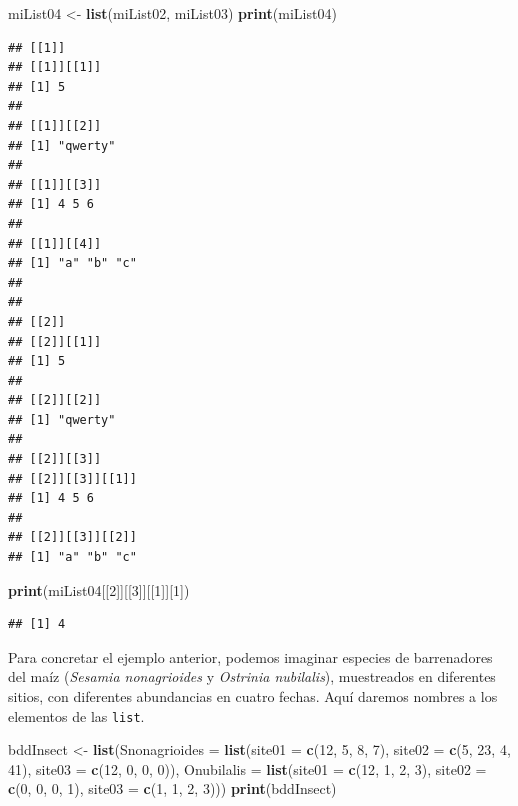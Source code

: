\documentclass[
]{book}
\newenvironment{Shaded}{\begin{snugshade}}{\end{snugshade}}
\newcommand{\DataTypeTok}[1]{\textcolor[rgb]{0.13,0.29,0.53}{#1}}
\newcommand{\DecValTok}[1]{\textcolor[rgb]{0.00,0.00,0.81}{#1}}
\newcommand{\KeywordTok}[1]{\textcolor[rgb]{0.13,0.29,0.53}{\textbf{#1}}}
\newcommand{\NormalTok}[1]{#1}
\newcommand{\StringTok}[1]{\textcolor[rgb]{0.31,0.60,0.02}{#1}}
\begin{document}
\begin{Shaded}
\begin{Highlighting}[]
\NormalTok{miList04 <-}\StringTok{ }\KeywordTok{list}\NormalTok{(miList02, miList03)}
\KeywordTok{print}\NormalTok{(miList04)}
\end{Highlighting}
\end{Shaded}

\begin{verbatim}
## [[1]]
## [[1]][[1]]
## [1] 5
## 
## [[1]][[2]]
## [1] "qwerty"
## 
## [[1]][[3]]
## [1] 4 5 6
## 
## [[1]][[4]]
## [1] "a" "b" "c"
## 
## 
## [[2]]
## [[2]][[1]]
## [1] 5
## 
## [[2]][[2]]
## [1] "qwerty"
## 
## [[2]][[3]]
## [[2]][[3]][[1]]
## [1] 4 5 6
## 
## [[2]][[3]][[2]]
## [1] "a" "b" "c"
\end{verbatim}

\begin{Shaded}
\begin{Highlighting}[]
\KeywordTok{print}\NormalTok{(miList04[[}\DecValTok{2}\NormalTok{]][[}\DecValTok{3}\NormalTok{]][[}\DecValTok{1}\NormalTok{]][}\DecValTok{1}\NormalTok{])}
\end{Highlighting}
\end{Shaded}

\begin{verbatim}
## [1] 4
\end{verbatim}

Para concretar el ejemplo anterior, podemos imaginar especies de barrenadores del maíz (\emph{Sesamia nonagrioides} y \emph{Ostrinia nubilalis}), muestreados en diferentes sitios, con diferentes abundancias en cuatro fechas. Aquí daremos nombres a los elementos de las \texttt{list}.

\begin{Shaded}
\begin{Highlighting}[]
\NormalTok{bddInsect <-}\StringTok{ }\KeywordTok{list}\NormalTok{(}\DataTypeTok{Snonagrioides =} \KeywordTok{list}\NormalTok{(}\DataTypeTok{site01 =} \KeywordTok{c}\NormalTok{(}\DecValTok{12}\NormalTok{, }\DecValTok{5}\NormalTok{, }\DecValTok{8}\NormalTok{, }\DecValTok{7}\NormalTok{), }\DataTypeTok{site02 =} \KeywordTok{c}\NormalTok{(}\DecValTok{5}\NormalTok{, }\DecValTok{23}\NormalTok{, }\DecValTok{4}\NormalTok{, }\DecValTok{41}\NormalTok{), }\DataTypeTok{site03 =} \KeywordTok{c}\NormalTok{(}\DecValTok{12}\NormalTok{, }\DecValTok{0}\NormalTok{, }\DecValTok{0}\NormalTok{, }\DecValTok{0}\NormalTok{)), }\DataTypeTok{Onubilalis =} \KeywordTok{list}\NormalTok{(}\DataTypeTok{site01 =} \KeywordTok{c}\NormalTok{(}\DecValTok{12}\NormalTok{, }\DecValTok{1}\NormalTok{, }\DecValTok{2}\NormalTok{, }\DecValTok{3}\NormalTok{), }\DataTypeTok{site02 =} \KeywordTok{c}\NormalTok{(}\DecValTok{0}\NormalTok{, }\DecValTok{0}\NormalTok{, }\DecValTok{0}\NormalTok{, }\DecValTok{1}\NormalTok{), }\DataTypeTok{site03 =} \KeywordTok{c}\NormalTok{(}\DecValTok{1}\NormalTok{, }\DecValTok{1}\NormalTok{, }\DecValTok{2}\NormalTok{, }\DecValTok{3}\NormalTok{)))}
\KeywordTok{print}\NormalTok{(bddInsect)}
\end{Highlighting}
\end{Shaded}
\end{document}
